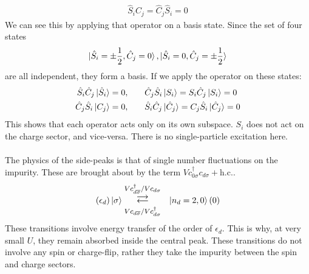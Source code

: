 \documentclass[twoside]{report}
\numberwithin{equation}{section}
\begin{document}
\begin{equation}\begin{aligned}
	\hat S_i \hat C_j = \hat C_j \hat S_i = 0
\end{aligned}\end{equation}
We can see this by applying that operator on a basis state. Since the set of four states 
\begin{equation}\begin{aligned}
	\ket{\hat S_i = \pm \frac{1}{2}, \hat C_j = 0}, \ket{\hat S_i = 0, \hat C_j = \pm\frac{1}{2}}
\end{aligned}\end{equation}
are all independent, they form a basis. If we apply the operator on these states:
\begin{equation}\begin{aligned}
	\hat S_i \hat C_j \ket{\hat S_i} &= 0, &&&&\hat C_j \hat S_i \ket{S_i} = S_i \hat C_j \ket{S_i} = 0\\
	\hat C_j \hat S_i \ket{C_j} &= 0, &&&&\hat S_i \hat C_j \ket{\hat C_j} = C_j \hat S_i \ket{\hat C_j} = 0 \\
\end{aligned}\end{equation}
This shows that each operator acts only on its own subspace. \(S_i\) does not act on the charge sector, and vice-versa. There is no single-particle excitation here.
\\\\The physics of the side-peaks is that of single number fluctuations on the impurity. These are brought about by the term \(Vc^\dagger_{0\sigma}c_{d\sigma} + \text{h.c.}\).
\begin{equation}\begin{aligned}
	\left( \epsilon_d  \right) \ket{\sigma} & \mathrel{\mathlarger{\mathlarger{\mathop{\rightleftarrows}}^{V c^\dagger_{d\overline\sigma}/V c_{d\sigma}}_{V c_{d\overline\sigma}/V c^\dagger_{d\sigma}}}} &\ket{n_d=2,0} \left( 0 \right) \\
\end{aligned}\end{equation}
These transitions involve energy transfer of the order of \(\epsilon_d\). This is why, at very small \(U\), they remain absorbed inside the central peak. These transitions do not involve any spin or charge-flip, rather they take the impurity between the spin and charge sectors.
\end{document}
